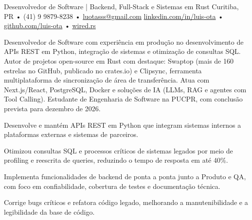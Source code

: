




\cvheader
  {Desenvolvedor de Software | Backend, Full-Stack e Sistemas em Rust}
  {Curitiba, PR • (41) 9 9879-8238 • \href{mailto:luotasss@gmail.com}{luotasss@gmail.com}}
  {\href{https://linkedin.com/in/luis-ota}{linkedin.com/in/luis-ota} • \href{https://github.com/luis-ota}{github.com/luis-ota} • \href{https://wired.rs}{wired.rs}}

Desenvolvedor de Software com experiência em produção no desenvolvimento de APIs REST em Python, integração de sistemas e otimização de consultas SQL. Autor de projetos open-source em Rust com destaque: Swaptop (mais de 160 estrelas no GitHub, publicado no crates.io) e Clipsync, ferramenta multiplataforma de sincronização de área de transferência. Atua com Next.js/React, PostgreSQL, Docker e soluções de IA (LLMs, RAG e agentes com Tool Calling). Estudante de Engenharia de Software na PUCPR, com conclusão prevista para dezembro de 2026.



\begin{cvbullets}
  \item Desenvolve e mantém APIs REST em Python que integram sistemas internos a plataformas externas e sistemas de parceiros.
  \item Otimizou consultas SQL e processos críticos de sistemas legados por meio de profiling e reescrita de queries, reduzindo o tempo de resposta em até 40\%.
  \item Implementa funcionalidades de backend de ponta a ponta junto a Produto e QA, com foco em confiabilidade, cobertura de testes e documentação técnica.
  \item Corrige bugs críticos e refatora código legado, melhorando a manutenibilidade e a legibilidade da base de código.
\end{cvbullets}

